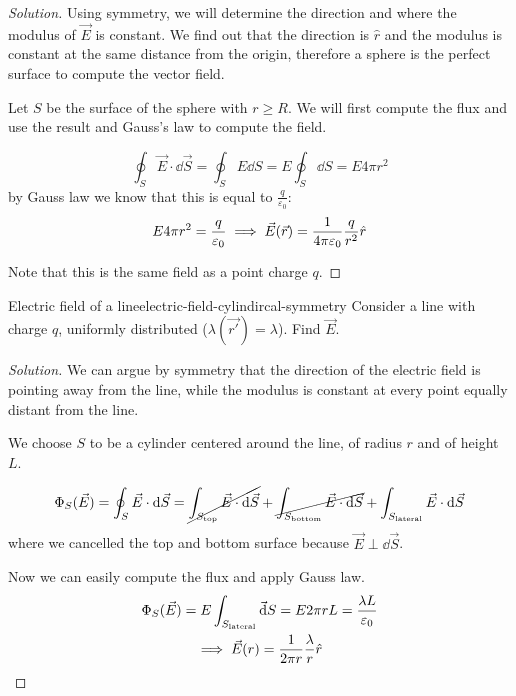 \documentclass[12pt]{extarticle}
\begin{document}
\begin{proof}[Solution]
	Using symmetry, we will determine the direction and where the modulus of $\vec E$ is constant.
	We find out that the direction is $\hat r$ and the modulus is constant at the same distance from the origin, therefore a sphere is the perfect surface to compute the vector field.

	Let $S$ be the surface of the sphere with $r \geq R$. We will first compute the flux and use the result and Gauss's law to compute the field.

	\begin{equation}
		\oint_S \vec E \cdot \dd{\vec S} = \oint_S E\dd{S} = E \oint_S \dd{S} = E 4 \pi r^2
	\end{equation}
	by Gauss law we know that this is equal to $\frac{q}{\varepsilon_0}$:
	\begin{equation}
		E 4 \pi r^2 = \frac{q}{\varepsilon_0} \implies \vec E(\vec r) = \frac{1}{4 \pi \varepsilon_0} \frac{q}{r^2} \hat r
	\end{equation}

	Note that this is the same field as a point charge $q$.
\end{proof}

\begin{example}{Electric field of a line}{electric-field-cylindircal-symmetry}
	Consider a line with charge $q$, uniformly distributed ($\lambda(\vec{r'}) = \lambda$).
	Find $\vec E$.
\end{example}

\begin{proof}[Solution]
	We can argue by symmetry that the direction of the electric field is pointing away from the line, while the modulus is constant at every point equally distant from the line.

	We choose $S$ to be a cylinder centered around the line, of radius $r$ and of height $L$.

	\begin{equation}
		\Phi_S(\vec E) = \oint_S \vec E \cdot \dd{\vec S} = \cancel{\int_{S_\text{top}} \vec E \cdot  \dd{\vec S}} + \cancel{\int_{S_\text{bottom}} \vec E \cdot  \dd{\vec S}} + \int_{S_\text{lateral}} \vec E \cdot  \dd{\vec S}
	\end{equation}
	where we cancelled the top and bottom surface because $\vec E \perp \dd{\vec S}$.

	Now we can easily compute the flux and apply Gauss law.
	\begin{gather}
		\Phi_S(\vec E) =  E \int_{S_\text{lateral}} \vec \dd{S} = E 2 \pi r L = \frac{\lambda L}{\varepsilon_0}\\
		\implies \vec E(r) = \frac{1}{2 \pi r} \frac{\lambda}{r} \hat r
	\end{gather}
\end{proof}
\end{document}
